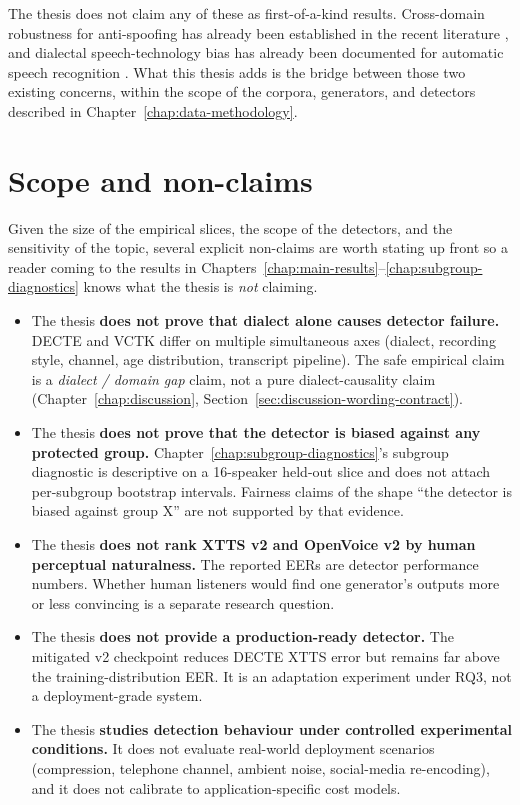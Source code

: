 The thesis does not claim any of these as first-of-a-kind
results. Cross-domain robustness for anti-spoofing has already
been established in the recent literature
\cite{Li2024_CrossDomainADD} \cite{Muller2024_HarderDifferent}, and
dialectal speech-technology bias has already been documented for
automatic speech recognition \cite{Koenecke2020_ASRDisparities}.
What this thesis adds is the bridge between those two existing
concerns, within the scope of the corpora, generators, and
detectors described in Chapter~\ref{chap:data-methodology}.


\section{Scope and non-claims}
\label{sec:introduction-scope}

Given the size of the empirical slices, the scope of the
detectors, and the sensitivity of the topic, several explicit
non-claims are worth stating up front so a reader coming to the
results in Chapters~\ref{chap:main-results}--\ref{chap:subgroup-diagnostics}
knows what the thesis is \emph{not} claiming.

\begin{itemize}
    \item The thesis \textbf{does not prove that dialect alone causes detector
        failure.} DECTE and VCTK differ on multiple simultaneous axes
        (dialect, recording style, channel, age distribution,
        transcript pipeline). The safe empirical claim is a
        \emph{dialect / domain gap} claim, not a pure dialect-causality
        claim (Chapter~\ref{chap:discussion},
        Section~\ref{sec:discussion-wording-contract}).
    \item The thesis \textbf{does not prove that the detector is biased
        against any protected group.} Chapter~\ref{chap:subgroup-diagnostics}'s
        subgroup diagnostic is descriptive on a 16-speaker held-out
        slice and does not attach per-subgroup bootstrap intervals.
        Fairness claims of the shape ``the detector is biased against
        group X'' are not supported by that evidence.
    \item The thesis \textbf{does not rank XTTS v2 and OpenVoice v2 by human
        perceptual naturalness.} The reported EERs are detector
        performance numbers. Whether human listeners would find one
        generator's outputs more or less convincing is a separate
        research question.
    \item The thesis \textbf{does not provide a production-ready detector.}
        The mitigated v2 checkpoint reduces DECTE XTTS error but
        remains far above the training-distribution EER. It is an
        adaptation experiment under RQ3, not a deployment-grade
        system.
    \item The thesis \textbf{studies detection behaviour under controlled
        experimental conditions.} It does not evaluate real-world
        deployment scenarios (compression, telephone channel, ambient
        noise, social-media re-encoding), and it does not calibrate to
        application-specific cost models.
\end{itemize}

